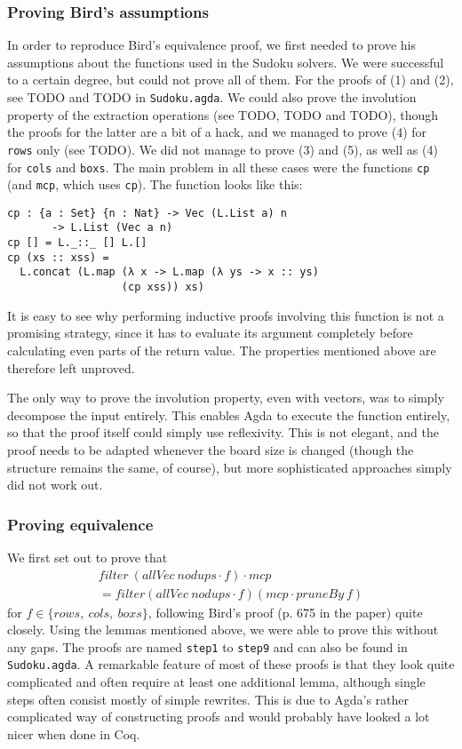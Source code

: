 \documentclass[a4paper,11pt]{article}
\begin{document}
\subsubsection{Proving Bird's assumptions}
In order to reproduce Bird's equivalence proof, we first needed to prove his assumptions about the functions used in the Sudoku solvers. We were successful to a certain degree, but could not prove all of them. For the proofs of (1) and (2), see TODO and TODO in \texttt{Sudoku.agda}. We could also prove the involution property of the extraction operations (see TODO, TODO and TODO), though the proofs for the latter are a bit of a hack, and we managed to prove (4) for \texttt{rows} only (see TODO). We did not manage to prove (3) and (5), as well as (4) for \texttt{cols} and \texttt{boxs}. The main problem in all these cases were the functions \texttt{cp} (and \texttt{mcp}, which uses \texttt{cp}). The function looks like this:
\begin{lstlisting}
cp : {a : Set} {n : Nat} -> Vec (L.List a) n 
       -> L.List (Vec a n)
cp [] = L._::_ [] L.[]
cp (xs :: xss) = 
  L.concat (L.map (λ x -> L.map (λ ys -> x :: ys) 
                  (cp xss)) xs)
\end{lstlisting}

It is easy to see why performing inductive proofs involving this function is not a promising strategy, since it has to evaluate its argument completely before calculating even parts of the return value. The properties mentioned above are therefore left unproved.

The only way to prove the involution property, even with vectors, was to simply decompose the input entirely. This enables Agda to execute the function entirely, so that the proof itself could simply use reflexivity. This is not elegant, and the proof needs to be adapted whenever the board size is changed (though the structure remains the same, of course), but more sophisticated approaches simply did not work out.

\subsubsection{Proving equivalence}
We first set out to prove that 
\begin{align*}
  filter~(allVec~nodups \cdot f) \cdot mcp \\= filter (allVec~nodups\cdot f) (mcp \cdot pruneBy~f)
\end{align*} 
for $f \in \{rows,~cols,~boxs\}$, following Bird's proof (p. 675 in the paper) quite closely. Using the lemmas mentioned above, we were able to prove this without any gaps. The proofs are named \texttt{step1} to \texttt{step9} and can also be found in \texttt{Sudoku.agda}. A remarkable feature of most of these proofs is that they look quite complicated and often require at least one additional lemma, although single steps often consist mostly of simple rewrites. This is due to Agda's rather complicated way of constructing proofs and would probably have looked a lot nicer when done in Coq.
\end{document}
